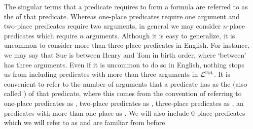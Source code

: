 The singular terms that a predicate requires to form a formula are referred to as the  of that predicate.
Whereas one-place predicates require one argument and two-place predicates require two arguments, in general we may consider $n$-place predicates which require $n$ arguments. 
Although it is easy to generalize, it is uncommon to consider more than three-place predicates in English.
For instance, we may say that Sue is between Henry and Tom in birth order, where `between' has three arguments.
Even if it is uncommon to do so in English, nothing stops us from including predicates with more than three arguments in $\mathcal{L}^{\textsc{fol}}$.
It is convenient to refer to the number of arguments that a predicate has as the  (also called ) of that predicate, where this comes from the convention of referring to one-place predicates as , two-place predicates as , three-place predicates as , an predicates with more than one place as .
We will also include $0$-place predicates which we will refer to as  and are familiar from before.


